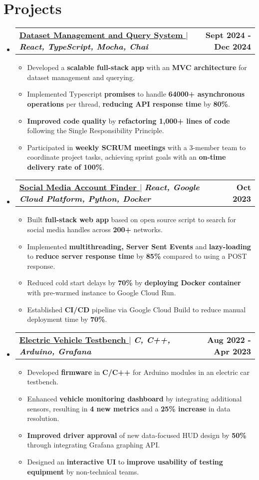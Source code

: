 \documentclass[letterpaper,11pt]{article}
\makeatletter
\newcommand{\bluey}[1]{{\color{customblue}#1}}
\newcommand{\resumeItem}[1]{
  \item\small{
    {#1 \vspace{-2pt}}
  }
}
\newcommand{\resumeProjectHeading}[2]{
    \item
    \begin{tabular*}{1.001\textwidth}{l@{\extracolsep{\fill}}r}
      \small#1 & \textbf{\small #2}\\
    \end{tabular*}\vspace{-7pt}
}
\newcommand{\resumeSubHeadingListStart}{\begin{itemize}[leftmargin=0.0in, label={}]}
\newcommand{\resumeSubHeadingListEnd}{\end{itemize}}
\newcommand{\resumeItemListStart}{\begin{itemize}}
\newcommand{\resumeItemListEnd}{\end{itemize}\vspace{-5pt}}
\makeatother
\begin{document}
\section{Projects}
    \vspace{-5pt}
    \resumeSubHeadingListStart
      \resumeProjectHeading
          {\textbf{\bluey{\href{https://github.com/underscoreHasan/InsightUBC-Project}{Dataset Management and Query System \faLink}}} $|$ \emph{\textbf{React, TypeScript, Mocha, Chai}}}{Sept 2024 - Dec 2024}
          \resumeItemListStart
            \resumeItem{Developed a \textbf{scalable full-stack app} with an \textbf{MVC architecture} for dataset management and querying.}
            \resumeItem{Implemented Typescript \textbf{promises} to handle \textbf{64000+ asynchronous operations} per thread, \textbf{reducing API response time} by \textbf{80\%}.}
            \resumeItem{\textbf{Improved code quality} by \textbf{refactoring 1,000+ lines of code} following the Single Responsibility Principle.}
            \resumeItem{Participated in \textbf{weekly SCRUM meetings} with a 3-member team to coordinate project tasks, achieving sprint goals with an \textbf{on-time delivery rate of 100\%}.}
          \resumeItemListEnd 
          \vspace{-13pt}
      \resumeProjectHeading
          {\textbf{\bluey{\href{https://devpost.com/software/sherlockify}{Social Media Account Finder \faLink}}} $|$ \emph{ \textbf{React, Google Cloud Platform, Python, Docker}}}{Oct 2023}
          \resumeItemListStart
            \resumeItem{Built \textbf{full-stack web app} based on open source script to search for social media handles across \textbf{200+} networks.}
            \resumeItem{Implemented \textbf{multithreading, Server Sent Events} and \textbf{lazy-loading} to \textbf{reduce server response time} by \textbf{85\%} compared to using a POST response.}
            \resumeItem{Reduced cold start delays by \textbf{70\%} by \textbf{deploying Docker container} with pre-warmed instance to Google Cloud Run.}
          \resumeItem{Established \textbf{CI/CD} pipeline via Google Cloud Build to reduce manual deployment time by \textbf{70\%}.}
        \resumeItemListEnd
        \vspace{-13pt}
      \resumeProjectHeading
          {\textbf{\bluey{\href{https://github.com/supermileage/dynamometer-firmware}{Electric Vehicle Testbench \faLink}}} $|$ \emph{\textbf{C, C++, Arduino, Grafana}}}{Aug 2022 - Apr 2023}
          \resumeItemListStart
            \resumeItem{Developed \textbf{firmware} in \textbf{C/C++} for Arduino modules in an electric car testbench.}
            \resumeItem{Enhanced \textbf{vehicle monitoring dashboard} by integrating additional sensors, resulting in \textbf{4 new metrics} and a \textbf{25\% increase} in data resolution.}
            \resumeItem{\textbf{Improved driver approval} of new data-focused HUD design by \textbf{50\%} through integrating Grafana graphing API.}
            \resumeItem{Designed an \textbf{interactive UI} to \textbf{improve usability of testing equipment} by non-technical teams.}            
          \resumeItemListEnd 
    \resumeSubHeadingListEnd
\vspace{-15pt}
\end{document}
